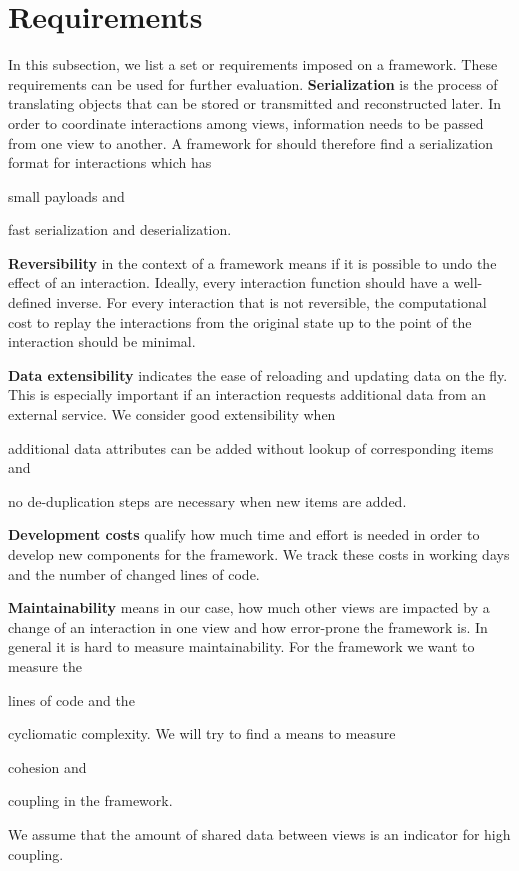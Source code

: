 \section{Requirements}\label{sec:analysis:requirements}
In this subsection, we list a set or requirements imposed on a \cmv{} framework.
These requirements can be used for further evaluation.
\textbf{Serialization} is the process of translating objects that can be stored or transmitted and reconstructed later.
In order to coordinate interactions among views, information needs to be passed from one view to another.
A framework for \cmvs{} should therefore find a serialization format for interactions which has
\begin{enumerate*}[label=(\arabic*)]
  \item
    small payloads and
  \item 
    fast serialization and deserialization.
\end{enumerate*}

\textbf{Reversibility} in the context of a \cmv{} framework means if it is possible to undo the effect of an interaction.
Ideally, every interaction function should have a well-defined inverse.
For every interaction that is not reversible, the computational cost to replay the interactions from the original state up to the point of the interaction should be minimal.

\textbf{Data extensibility} indicates the ease of reloading and updating data on the fly.
This is especially important if an interaction requests additional data from an external service.
We consider good extensibility when
\begin{enumerate*}[label=(\arabic*)]
  \item
    additional data attributes can be added without lookup of corresponding items and
  \item
    no de-duplication steps are necessary when new items are added.
\end{enumerate*}

\textbf{Development costs} qualify how much time and effort is needed in order to develop new components for the \cmv{} framework.
We track these costs in working days and the number of changed lines of code.


\textbf{Maintainability} means in our case, how much other views are impacted by a change of an interaction in one view and how error-prone the framework is.
In general it is hard to measure maintainability.
For the \cmv{} framework we want to measure the
\begin{enumerate*}[label=(\arabic*)]
  \item
    lines of code and the
  \item
    cycliomatic complexity. We will try to find a means to measure
  \item
    cohesion and
  \item
    coupling in the framework.
\end{enumerate*}
We assume that the amount of shared data between views is an indicator for high coupling.


